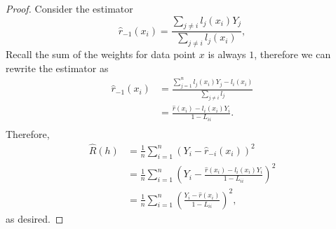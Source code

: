 \begin{proof} Consider the estimator \[
\hat{r}_{-1}(x_i) = \frac{\sum_{j \not = i} l_j(x_i) Y_j}{\sum_{j \not = i} l_j(x_i)},
\] 
Recall the sum of the weights for data point $x$ is always $1$, therefore we can rewrite the estimator as
\begin{align*}
    \hat{r}_{-1}(x_i) &= \frac{\sum_{j = 1}^{n} l_j(x_i) Y_j - l_i(x_i)}{\sum_{j \not = i} l_j} \\
    &= \frac{\hat{r}(x_i) - l_i(x_i)Y_i}{1 - L_{ii}}. \\
  \end{align*}
  Therefore,
  \begin{align*}
    \hat{R}(h) &= \frac{1}{n} \sum_{i = 1}^{n}(Y_i - \hat{r}_{-i}(x_i))^2\\
    &= \frac{1}{n} \sum_{i = 1}^{n}\left(Y_i - \frac{\hat{r}(x_i) - l_i(x_i)Y_i}{1 - L_{ii}}\right)^2\\
    &= \frac{1}{n} \sum_{i = 1}^{n}\left(\frac{Y_i - \hat{r}(x_i)}{1 - L_{ii}}\right)^2,
  \end{align*}
  as desired. 
\end{proof}

